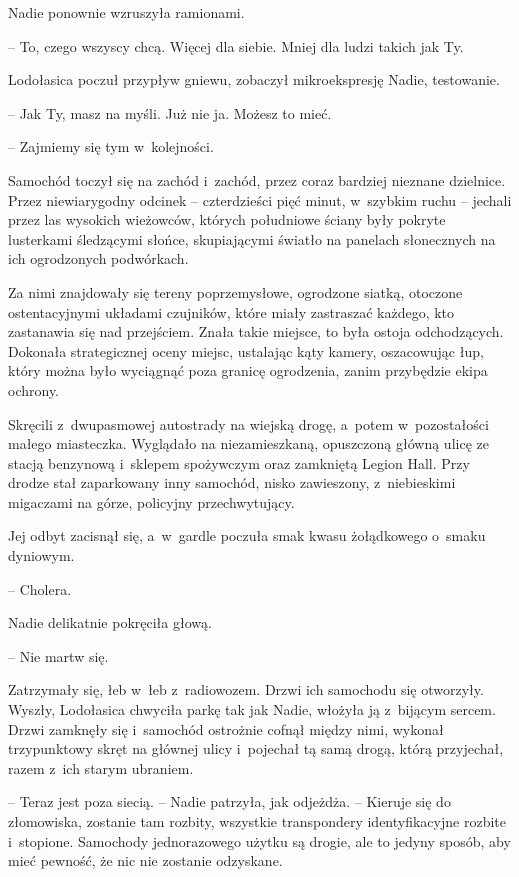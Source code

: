 \documentclass[oneside,polish,11pt,sfheadings]{mwbk}
\begin{document}
Nadie ponownie wzruszyła ramionami. 

-- To, czego wszyscy chcą. Więcej dla
siebie. Mniej dla ludzi takich jak Ty.

Lodołasica poczuł przypływ gniewu, zobaczył mikroekspresję Nadie,
testowanie.

-- Jak Ty, masz na myśli. Już nie ja. Możesz to mieć.

-- Zajmiemy się tym w~kolejności.

Samochód toczył się na zachód i~zachód, przez coraz bardziej nieznane
dzielnice. Przez niewiarygodny odcinek -- czterdzieści pięć minut, w~szybkim ruchu -- jechali przez las wysokich wieżowców, których południowe
ściany były pokryte lusterkami śledzącymi słońce, skupiającymi światło
na panelach słonecznych na ich ogrodzonych podwórkach.

Za nimi znajdowały się tereny poprzemysłowe, ogrodzone siatką, otoczone
ostentacyjnymi układami czujników, które miały zastraszać każdego, kto
zastanawia się nad przejściem. Znała takie miejsce, to była ostoja
odchodzących. Dokonała strategicznej oceny miejsc, ustalając kąty
kamery, oszacowując łup, który można było wyciągnąć poza granicę
ogrodzenia, zanim przybędzie ekipa ochrony.

Skręcili z~dwupasmowej autostrady na wiejską drogę, a~potem w~pozostałości małego miasteczka. Wyglądało na niezamieszkaną, opuszczoną
główną ulicę ze stacją benzynową i~sklepem spożywczym oraz zamkniętą
Legion Hall. Przy drodze stał zaparkowany inny samochód, nisko
zawieszony, z~niebieskimi migaczami na górze, policyjny przechwytujący.

Jej odbyt zacisnął się, a~w~gardle poczuła smak kwasu żołądkowego o~smaku dyniowym. 

-- Cholera.

Nadie delikatnie pokręciła głową. 

-- Nie martw się.

Zatrzymały się, łeb w~łeb z~radiowozem. Drzwi ich samochodu się
otworzyły. Wyszły, Lodołasica chwyciła parkę tak jak Nadie, włożyła ją z~bijącym sercem. Drzwi zamknęły się i~samochód ostrożnie cofnął między
nimi, wykonał trzypunktowy skręt na głównej ulicy i~pojechał tą samą
drogą, którą przyjechał, razem z~ich starym ubraniem.

-- Teraz jest poza siecią. -- Nadie patrzyła, jak odjeżdża. -- Kieruje się
do złomowiska, zostanie tam rozbity, wszystkie transpondery
identyfikacyjne rozbite i~stopione. Samochody jednorazowego użytku są
drogie, ale to jedyny sposób, aby mieć pewność, że nic nie zostanie
odzyskane.
\end{document}
